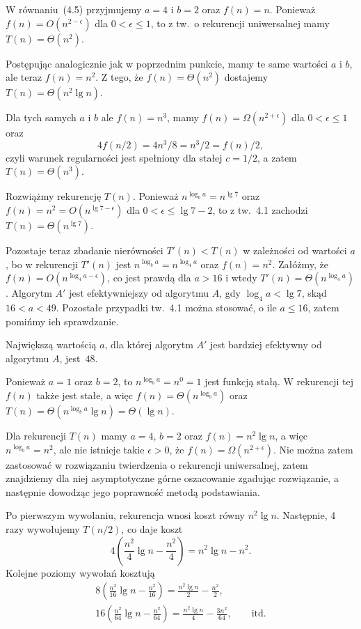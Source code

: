 
\exercise{} %

\subexercise{}
W równaniu~(4.5) przyjmujemy $a=4$ i $b=2$ oraz $f(n)=n$. Ponieważ $f(n)=O(n^{2-\epsilon})$ dla $0<\epsilon\le1$, to z tw.~o rekurencji uniwersalnej mamy $T(n)=\Theta(n^2)$.

\subexercise{}
Postępując analogicznie jak w poprzednim punkcie, mamy te same wartości $a$ i $b$, ale teraz $f(n)=n^2$. Z tego, że $f(n)=\Theta(n^2)$ dostajemy $T(n)=\Theta(n^2\lg n)$.

\subexercise{}
Dla tych samych $a$ i $b$ ale $f(n)=n^3$, mamy $f(n)=\Omega(n^{2+\epsilon})$ dla $0<\epsilon\le1$ oraz
\[
	4f(n/2) = 4n^3\!/8 = n^3\!/2 = f(n)/2,
\]
czyli warunek regularności jest spełniony dla stałej $c=1/2$, a zatem $T(n)=\Theta(n^3)$.

\exercise{} %
\noindent Rozwiążmy rekurencję $T(n)$. Ponieważ $n^{\log_ba}=n^{\lg7}$ oraz $f(n)=n^2=O(n^{\lg7-\epsilon})$ dla $0<\epsilon\le\lg7-2$, to z tw.~4.1 zachodzi $T(n)=\Theta(n^{\lg7})$.

Pozostaje teraz zbadanie nierówności $T'(n)<T(n)$ w zależności od wartości $a$, bo w rekurencji $T'(n)$ jest $n^{\log_ba}=n^{\log_4a}$ oraz $f(n)=n^2$. Załóżmy, że $f(n)=O(n^{\log_4a-\epsilon})$, co jest prawdą dla $a>16$ i wtedy $T'(n)=\Theta(n^{\log_4a})$. Algorytm $A'$ jest efektywniejszy od algorytmu $A$, gdy $\log_4a<\lg7$, skąd $16<a<49$. Pozostałe przypadki tw.~4.1 można stosować, o ile $a\le16$, zatem pomińmy ich sprawdzanie.

Największą wartością $a$, dla której algorytm $A'$ jest bardziej efektywny od algorytmu $A$, jest~$48$.

\exercise{} %
\noindent Ponieważ $a=1$ oraz $b=2$, to $n^{\log_ba}=n^0=1$ jest funkcją stałą. W rekurencji tej $f(n)$ także jest stałe, a więc $f(n)=\Theta(n^{\log_ba})$ oraz $T(n)=\Theta(n^{\log_ba}\lg n)=\Theta(\lg n)$.

\exercise{} %
\noindent Dla rekurencji $T(n)$ mamy $a=4$, $b=2$ oraz $f(n)=n^2\lg n$, a więc $n^{\log_ba}=n^2$, ale nie istnieje takie $\epsilon>0$, że $f(n)=\Omega(n^{2+\epsilon})$. Nie można zatem zastosować w rozwiązaniu twierdzenia o rekurencji uniwersalnej, zatem znajdziemy dla niej asymptotyczne górne oszacowanie zgadując rozwiązanie, a następnie dowodząc jego poprawność metodą podstawiania.

Po pierwszym wywołaniu, rekurencja wnosi koszt równy $n^2\lg n$. Następnie, 4 razy wywołujemy $T(n/2)$, co daje koszt
\[
	4\left(\frac{n^2}{4}\lg n-\frac{n^2}{4}\right) = n^2\lg n-n^2.
\]
Kolejne poziomy wywołań kosztują
\begin{gather*}
	8\left(\frac{n^2}{16}\lg n-\frac{n^2}{16}\right) = \frac{n^2\lg n}{2}-\frac{n^2}{2}, \qquad\phantom{itd.} \\
	16\left(\frac{n^2}{64}\lg n-\frac{n^2}{64}\right) = \frac{n^2\lg n}{4}-\frac{3n^2}{64}, \qquad\text{itd.}
\end{gather*}

